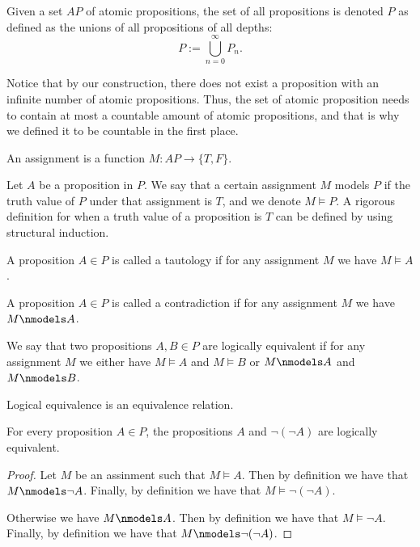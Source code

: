 \documentclass[11pt,a4paper]{article}
\begin{document}
  \begin{definition}
    Given a set $AP$ of atomic propositions, the set of all propositions
    is denoted $P$ as defined as the unions of all propositions of all
    depths:
    \[
      P := \bigcup_{n=0}^{\infty} P_n.
    \]
  \end{definition}

  \begin{remark}
    Notice that by our construction, there does not exist a proposition
    with an infinite number of atomic propositions. Thus, the set of
    atomic proposition needs to contain at most a countable amount
    of atomic propositions, and that is why we defined it to be
    countable in the first place.
  \end{remark}

  \begin{definition}[Assignment]
    An assignment is a function $M \colon AP \to \{T,F\}$.
  \end{definition}

  Let $A$ be a proposition in $P$.
  We say that a certain assignment $M$ models $P$ if the truth
  value of $P$ under that assignment is $T$, and we denote $M \models P$.
  A rigorous definition for when a truth value of a proposition is $T$ 
  can be defined by using structural induction.

  \begin{definition}[Tautology]
    A proposition $A \in P$ is called a tautology if for any assignment
    $M$ we have $M \models A$.
  \end{definition}

  \begin{definition}[Contradiction]
    A proposition $A \in P$ is called a contradiction if for any assignment
    $M$ we have $M \nmodels A$.
  \end{definition}
  
  \begin{definition}
    We say that two propositions $A,B \in P$ are logically equivalent
    if for any assignment $M$ we either have $M \models A$ and
    $M \models B$ or $M \nmodels A$ and $M \nmodels B$.
  \end{definition}

  \begin{remark}
    Logical equivalence is an equivalence relation.
  \end{remark}

  \begin{proposition}
    For every proposition $A \in P$, the propositions $A$ and
    $\neg(\neg A)$ are logically equivalent.
  \end{proposition}
  \begin{proof}
    Let $M$ be an assinment such that $M \models A$.
    Then by definition we have that $M \nmodels \neg A$.
    Finally, by definition we have that $M \models \neg(\neg A)$.

    Otherwise we have $M \nmodels A$.
    Then by definition we have that $M \models \neg A$.
    Finally, by definition we have that $M \nmodels \neg(\neg A)$.
  \end{proof}
\end{document}
